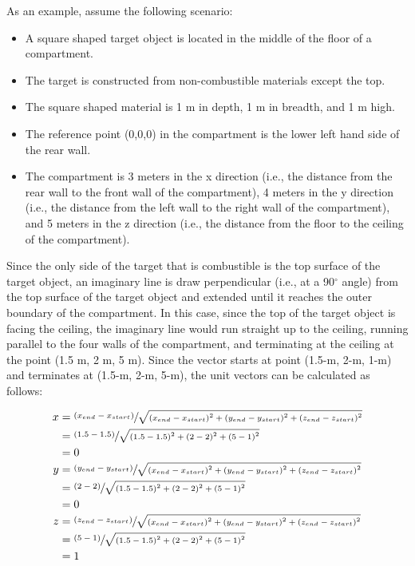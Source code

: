 As an example, assume the following scenario:

\begin{itemize}
\item A square shaped target object is located in the middle of the floor of a compartment.
\item The target is constructed from non-combustible materials except the top.
\item The square shaped material is 1 m in depth, 1 m in breadth, and 1 m high.
\item The reference point (0,0,0) in the compartment is the lower left hand side of the rear wall.
\item The compartment is 3 meters in the x direction (i.e., the distance from the rear wall to the front wall of the compartment), 4 meters in the y direction (i.e., the distance from the left wall to the right wall of the compartment), and 5 meters in the z direction (i.e., the distance from the floor to the ceiling of the compartment).
\end{itemize}

Since the only side of the target that is combustible is the top surface of the target object, an imaginary line is draw perpendicular (i.e., at a 90$^\circ$ angle) from the top surface of the target object and extended until it reaches the outer boundary of the compartment.  In this case, since the top of the target object is facing the ceiling, the imaginary line would run straight up to the ceiling, running parallel to the four walls of the compartment, and terminating at the ceiling at the point (1.5 m, 2 m, 5 m).  Since the vector starts at point (1.5-m, 2-m, 1-m) and terminates at (1.5-m, 2-m, 5-m), the unit vectors can be calculated as follows:


\begin{equation}
  \begin{aligned}
 x &= \sfrac{{ \left( {x_{end} - x_{start}} \right) }}{\sqrt{{ \left( {x_{end} - x_{start}} \right) }^2 + { \left( {y_{end} - y_{start}} \right) }^2 + { \left( {z_{end} - z_{start}} \right) }^2}} \\
 &= \sfrac{{ \left( {1.5 - 1.5} \right) }}{\sqrt{{ \left( {1.5 - 1.5} \right) }^2 + { \left( {2 - 2} \right) }^2 + { \left( {5 - 1} \right) }^2}} \\
 &= 0\\
 y &= \sfrac{{ \left( {y_{end} - y_{start}} \right) }}{\sqrt{{ \left( {x_{end} - x_{start}} \right) }^2 + { \left( {y_{end} - y_{start}} \right) }^2 + { \left( {z_{end} - z_{start}} \right) }^2}} \\
 &= \sfrac{{ \left( {2 - 2} \right) }}{\sqrt{{ \left( {1.5 - 1.5} \right) }^2 + { \left( {2 - 2} \right) }^2 + { \left( {5 - 1} \right) }^2}} \\
 &= 0 \\
 z &= \sfrac{{ \left( {z_{end} - z_{start}} \right) }}{\sqrt{{ \left( {x_{end} - x_{start}} \right) }^2 + { \left( {y_{end} - y_{start}} \right) }^2 + { \left( {z_{end} - z_{start}} \right) }^2}} \\
 &= \sfrac{{ \left( {5 - 1} \right) }}{\sqrt{{ \left( {1.5 - 1.5} \right) }^2 + { \left( {2 - 2} \right) }^2 + { \left( {5 - 1} \right) }^2}} \\
 &= 1\\
  \end{aligned}
\end{equation}

